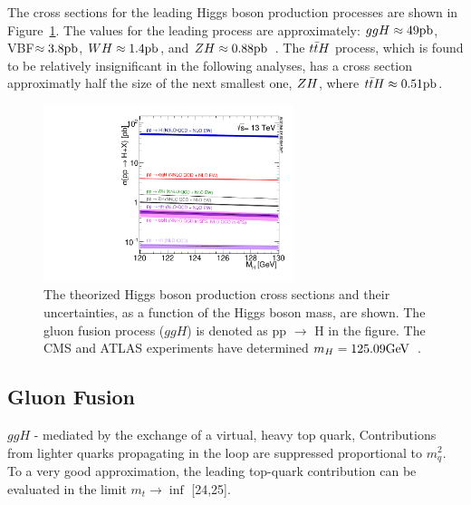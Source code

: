 The cross sections for the leading Higgs boson production processes
are shown in Figure~\ref{fig:higgs_production}. The values for the leading
process are approximately: $ggH \approx 49\mathrm{pb}$, VBF$ \approx 3.8\mathrm{pb}$, $WH \approx 1.4\mathrm{pb}$,
and $ZH \approx 0.88\mathrm{pb}$~\cite{deFlorian:2016spz}. The $t\bar{t}H$ process,
which is found to be relatively insignificant in the following analyses, has a cross
section approximatly half the size of the next smallest one, $ZH$, where
$t\bar{t}H \approx 0.51\mathrm{pb}$.


\begin{figure}[htbp]
\centering
     \includegraphics[width=0.65\textwidth]{phenomology_of_processes/plots/plot_13tev_H_sqrt.pdf}
     \caption{
The theorized Higgs boson production cross sections and their uncertainties,
as a function of the Higgs boson mass, are shown. The gluon fusion process ($ggH$)
is denoted as pp $\to$ H in the figure.
The CMS and ATLAS experiments have determined $m_{H} = 125.09\mathrm{GeV}$~\cite{Aad:2015zhl}.
     }
     \label{fig:higgs_production}
\end{figure}


\subsection{Gluon Fusion}
$ggH$ - mediated by the exchange of a virtual, heavy top quark, Contributions from lighter quarks propagating in the loop are suppressed proportional to $m^{2}_{q}$.
To a very good approximation, the leading top-quark contribution can be evaluated in the limit $m_{t} \to \inf$ [24,25].

